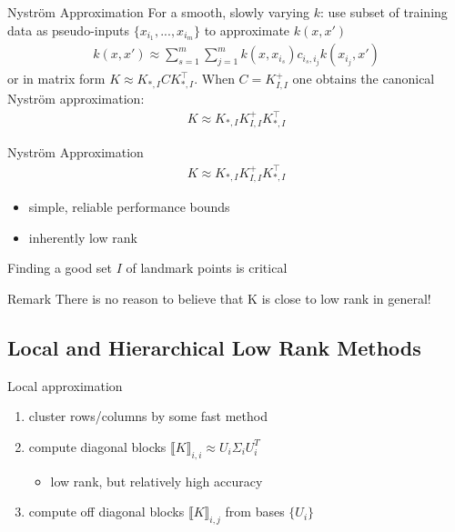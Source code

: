 \documentclass{beamer}
\begin{document}
\begin{frame}{Nystr\"om Approximation}
For a smooth, slowly varying $k$: use subset of training data as pseudo-inputs 
            $\{x_{i_1},...,x_{i_m}\}$ to approximate $k(x,x')$
    \begin{align*}
        k(x,x') \approx \sum_{s=1}^{m}\sum_{j=1}^{m} k(x,x_{i_s})c_{i_s,i_j}k(x_{i_j},x')
    \end{align*}
    or in matrix form $K \approx K_{*,I}CK_{*,I}^\top$. When $C=K_{I,I}^+$ one obtains the canonical Nystr\"om approximation:
    \begin{align*}
        K \approx K_{*,I}K_{I,I}^+K_{*,I}^\top
    \end{align*}
\end{frame}




\begin{frame}{Nystr\"om Approximation}
    \begin{align*}
        K \approx K_{*,I}K_{I,I}^+K_{*,I}^\top
    \end{align*}
    \begin{itemize}
        \item simple, reliable performance bounds
        \item inherently low rank
    \end{itemize}
    \pause
    Finding a good set $I$ of landmark points is critical
    \pause
    \begin{block}{Remark}
     There is no reason to believe that K is close to low rank in general!
    \end{block}
   
\end{frame}


\subsection{Local and Hierarchical Low Rank Methods}

\begin{frame}{Local approximation}
    \begin{enumerate}
        \item cluster rows/columns by some fast method
        \item compute diagonal blocks $\llbracket K\rrbracket_{i,i}\approx U_i\Sigma_iU_i^T$
        \begin{itemize}
            \item low rank, but relatively high accuracy
        \end{itemize}
        \item compute off diagonal blocks $\llbracket K\rrbracket_{i,j}$ from bases $\{U_i\}$
    \end{enumerate}
\end{frame}
\end{document}
